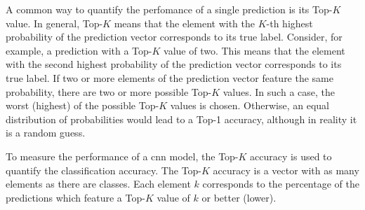 A common way to quantify the perfomance of a single prediction is its Top-$K$ value.
In general, Top-$K$ means that the element with the $K$-th highest probability of the prediction vector corresponds to its true label.
Consider, for example, a prediction with a Top-$K$ value of two.
This means that the element with the second highest probability of the prediction vector corresponds to its true label.
If two or more elements of the prediction vector feature the same probability, there are two or more possible Top-$K$ values.
In such a case, the worst (highest) of the possible Top-$K$ values is chosen.
Otherwise, an equal distribution of probabilities would lead to a Top-1 accuracy, although in reality it is a random guess.

To measure the performance of a \acrshort{cnn} model, the Top-$K$ accuracy is used to quantify the classification accuracy.
The Top-$K$ accuracy is a vector with as many elements as there are classes.
Each element $k$ corresponds to the percentage of the predictions which feature a Top-$K$ value of $k$ or better (lower).


